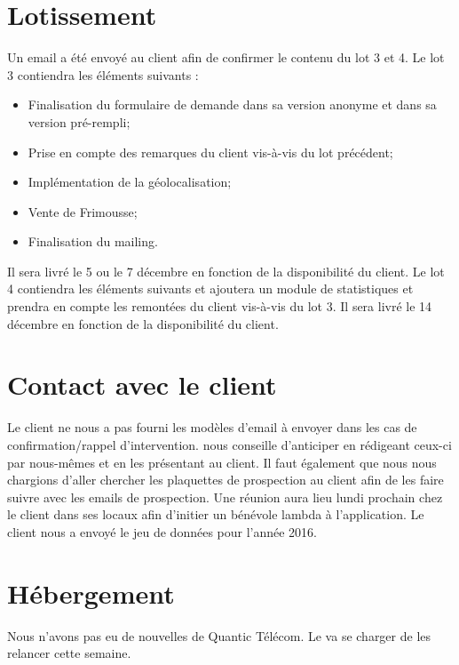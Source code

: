 \documentclass [a4paper] {article}
\begin{document}
\section{Lotissement}
	Un email a été envoyé au client afin de confirmer le contenu du lot 3 et 4. 
Le lot 3 contiendra les éléments suivants :
\begin{itemize}
	\item Finalisation du formulaire de demande dans sa version anonyme et dans sa version pré-rempli;
	\item Prise en compte des remarques du client vis-à-vis du lot précédent;
	\item Implémentation de la géolocalisation;
	\item Vente de Frimousse;
	\item Finalisation du mailing.
\end{itemize} Il sera livré le 5 ou le 7 décembre en fonction de la disponibilité du client.
Le lot 4 contiendra les éléments suivants et ajoutera un module de statistiques et prendra en compte les remontées du client vis-à-vis du lot 3.
Il sera livré le 14 décembre en fonction de la disponibilité du client.

\section{Contact avec le client}
Le client ne nous a pas fourni les modèles d'email à envoyer dans les cas de confirmation/rappel d'intervention. \nomTuteurPedago{} nous conseille d'anticiper en rédigeant ceux-ci par nous-mêmes et en les présentant au client. Il faut également que nous nous chargions d'aller chercher les plaquettes de prospection au client afin de les faire suivre avec les emails de prospection. 
Une réunion aura lieu lundi prochain chez le client dans ses locaux afin d'initier un bénévole lambda à l'application.
Le client nous a envoyé le jeu de données pour l'année 2016.

\section{Hébergement}
Nous n'avons pas eu de nouvelles de Quantic Télécom. Le \CP{} va se charger de les relancer cette semaine.
\newpage
\end{document}
